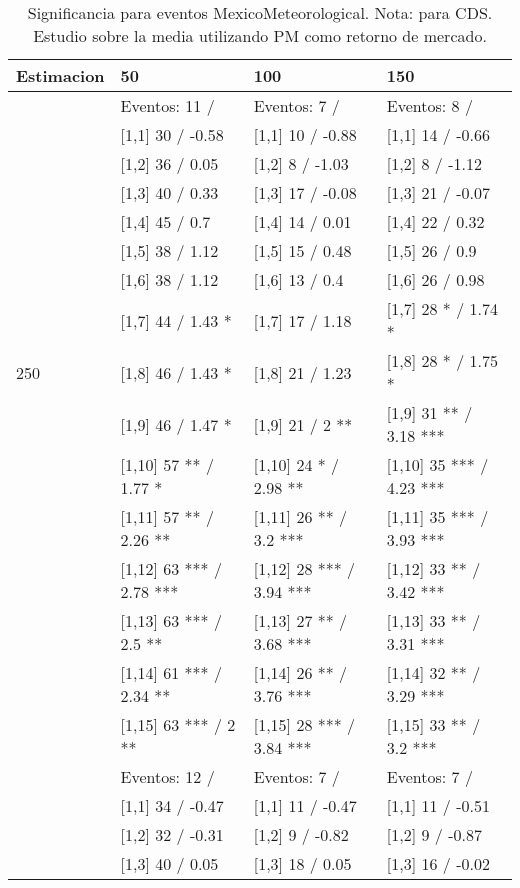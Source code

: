 \begin{table}

\caption{Significancia para eventos MexicoMeteorological. Nota: para CDS. Estudio sobre la media utilizando PM como retorno de mercado.}
\centering
\begin{tabular}[t]{llll}
\toprule
Estimacion & 50 & 100 & 150\\
\midrule
 & Eventos:  11 / & Eventos:  7 / & Eventos:  8 /\\
 & {}[1,1] 30  / -0.58 & {}[1,1] 10  / -0.88 & {}[1,1] 14  / -0.66\\
 & {}[1,2] 36  / 0.05 & {}[1,2] 8  / -1.03 & {}[1,2] 8  / -1.12\\
 & {}[1,3] 40  / 0.33 & {}[1,3] 17  / -0.08 & {}[1,3] 21  / -0.07\\
 & {}[1,4] 45  / 0.7 & {}[1,4] 14  / 0.01 & {}[1,4] 22  / 0.32\\
\addlinespace
 & {}[1,5] 38  / 1.12 & {}[1,5] 15  / 0.48 & {}[1,5] 26  / 0.9\\
 & {}[1,6] 38  / 1.12 & {}[1,6] 13  / 0.4 & {}[1,6] 26  / 0.98\\
 & {}[1,7] 44  / 1.43 * & {}[1,7] 17  / 1.18 & {}[1,7] 28 * / 1.74 *\\
250 & {}[1,8] 46  / 1.43 * & {}[1,8] 21  / 1.23 & {}[1,8] 28 * / 1.75 *\\
 & {}[1,9] 46  / 1.47 * & {}[1,9] 21  / 2 ** & {}[1,9] 31 ** / 3.18 ***\\
\addlinespace
 & {}[1,10] 57 ** / 1.77 * & {}[1,10] 24 * / 2.98 ** & {}[1,10] 35 *** / 4.23 ***\\
 & {}[1,11] 57 ** / 2.26 ** & {}[1,11] 26 ** / 3.2 *** & {}[1,11] 35 *** / 3.93 ***\\
 & {}[1,12] 63 *** / 2.78 *** & {}[1,12] 28 *** / 3.94 *** & {}[1,12] 33 ** / 3.42 ***\\
 & {}[1,13] 63 *** / 2.5 ** & {}[1,13] 27 ** / 3.68 *** & {}[1,13] 33 ** / 3.31 ***\\
 & {}[1,14] 61 *** / 2.34 ** & {}[1,14] 26 ** / 3.76 *** & {}[1,14] 32 ** / 3.29 ***\\
\addlinespace
 & {}[1,15] 63 *** / 2 ** & {}[1,15] 28 *** / 3.84 *** & {}[1,15] 33 ** / 3.2 ***\\
 & Eventos:  12 / & Eventos:  7 / & Eventos:  7 /\\
 & {}[1,1] 34  / -0.47 & {}[1,1] 11  / -0.47 & {}[1,1] 11  / -0.51\\
 & {}[1,2] 32  / -0.31 & {}[1,2] 9  / -0.82 & {}[1,2] 9  / -0.87\\
 & {}[1,3] 40  / 0.05 & {}[1,3] 18  / 0.05 & {}[1,3] 16  / -0.02\\

\end{tabular}
\end{table}
